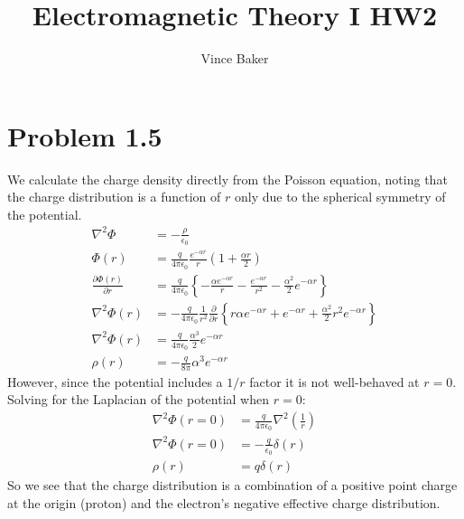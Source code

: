 \documentclass[a4paper,11pt]{article}
\title{Electromagnetic Theory I HW2}
\author{Vince Baker}
\numberwithin{equation}{section}
\newcommand{\ez}{\epsilon_0}
\newcommand{\lrb}[1]{\left\{{#1}\right\}}
\begin{document}
\maketitle

\section{Problem 1.5}
We calculate the charge density directly from the Poisson equation, noting that the charge distribution is a function of $r$ only due to the spherical symmetry of the potential.
\begin{align}
 \nabla^2\Phi &= -\frac{\rho}{\ez}\\
 \Phi(r) &= \frac{q}{4\pi\ez}\frac{e^{-\alpha r}}{r}\left(1+\frac{\alpha r}{2} \right)\\
 \frac{\partial \Phi(r)}{\partial r} &= \frac{q}{4\pi\ez}\lrb{-\frac{\alpha e^{-\alpha r}}{r}-\frac{e^{-\alpha r}}{r^2}-\frac{\alpha^2}{2}e^{-\alpha r}}\\
 \nabla^2\Phi(r) &= -\frac{q}{4\pi\ez}\frac{1}{r^2}\frac{\partial}{\partial r}\lrb{r\alpha e^{-\alpha r}+e^{-\alpha r}+\frac{\alpha^2}{2}r^2e^{-\alpha r}}\\ 
 \nabla^2\Phi(r) &= \frac{q}{4\pi\ez}\frac{\alpha^3}{2}e^{-\alpha r}\\
 \rho(r) &= -\frac{q}{8\pi}\alpha^3e^{-\alpha r}
\end{align}
However, since the potential includes a $1/r$ factor it is not well-behaved at $r=0$. 
Solving for the Laplacian of the potential when $r=0$:
\begin{align}
 \nabla^2\Phi(r=0) &= \frac{q}{4\pi\ez}\nabla^2(\frac{1}{r})\\
 \nabla^2\Phi(r=0) &= -\frac{q}{\ez}\delta(r)\\
 \rho(r) &= q\delta(r)
\end{align}
So we see that the charge distribution is a combination of a positive point charge at the origin (proton) and the electron's negative effective charge distribution.
\end{document}
